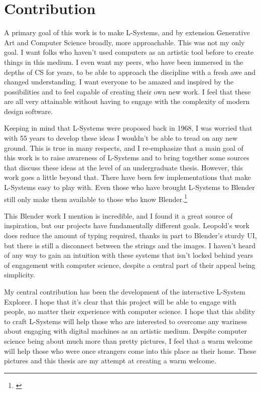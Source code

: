 \documentclass[12pt,twoside]{reedthesis}
\begin{document}
\chapter{Contribution}
	A primary goal of this work is to make L-Systems, and by extension Generative Art and Computer Science broadly, more approachable. This was not my only goal. I want folks who haven't used computers as an artistic tool before to create things in this medium. I even want my peers, who have been immersed in the depths of CS for years, to be able to approach the discipline with a fresh awe and changed understanding. I want everyone to be amazed and inspired by the possibilities and to feel capable of creating their own new work.  I feel that these are all very attainable without having to engage with the complexity of modern design software.
	
	Keeping in mind that L-Systems were proposed back in 1968, I was worried that with 55 years to develop these ideas I wouldn't be able to tread on any new ground. This is true in many respects, and I re-emphasize that a main goal of this work is to raise awareness of L-Systems and to bring together some sources that discuss these ideas at the level of an undergraduate thesis. However, this work goes a little beyond that. There have been few implementations that make L-Systems easy to play with. Even those who have brought L-Systems to Blender still only make them available to those who know Blender.\footnote{\cite{Leopold2017}} 
	
	This Blender work I mention is incredible, and I found it a great source of inspiration, but our projects have fundamentally different goals. Leopold's work does reduce the amount of typing required, thanks in part to Blender's sturdy UI, but there is still a disconnect between the strings and the images. I haven't heard of any way to gain an intuition with these systems that isn't locked behind years of engagement with computer science, despite a central part of their appeal being simplicity.
	
	
	My central contribution has been the development of the interactive L-System Explorer. I hope that it's clear that this project will be able to engage with people, no matter their experience with computer science. I hope that this ability to craft L-Systems will help those who are interested to overcome any wariness about engaging with digital machines as an artistic medium. Despite computer science being about much more than pretty pictures, I feel that a warm welcome will help those who were once strangers come into this place as their home. These pictures and this thesis are my attempt at creating a warm welcome.
\end{document}
